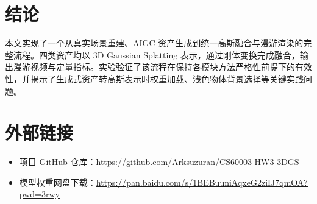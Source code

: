 \documentclass{article}
\begin{document}
\section{结论}

本文实现了一个从真实场景重建、AIGC 资产生成到统一高斯融合与漫游渲染的完整流程。四类资产均以 3D Gaussian Splatting 表示，通过刚体变换完成融合，输出漫游视频与定量指标。实验验证了该流程在保持各模块方法严格性前提下的有效性，并揭示了生成式资产转高斯表示时权重加载、浅色物体背景选择等关键实践问题。

\section*{外部链接}
\begin{itemize}
  \item 项目 GitHub 仓库：\url{https://github.com/Arksuzuran/CS60003-HW3-3DGS}
  \item 模型权重网盘下载：\url{https://pan.baidu.com/s/1BEBuuniAqxeG2ziIJ7qmOA?pwd=3rwy}
\end{itemize}



\end{document}
